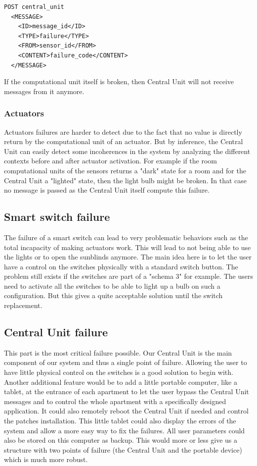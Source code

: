 \documentclass{acm_proc_article-sp}
\begin{document}
\begin{minipage}{\linewidth}
\begin{lstlisting}
POST central_unit 
  <MESSAGE>
    <ID>message_id</ID>
    <TYPE>failure</TYPE>
    <FROM>sensor_id</FROM>
    <CONTENT>failure_code</CONTENT>
  </MESSAGE>
\end{lstlisting}
\end{minipage}

If the computational unit itself is broken, then Central Unit will not receive messages from it anymore.
\subsubsection{Actuators} 
Actuators failures are harder to detect due to the fact that no value is directly return by the computational unit of an actuator.
But by inference, the Central Unit can easily detect some incoherences in the system by analyzing the different contexts before and after actuator activation.
For example if the room computational units of the sensors returns a "dark" state for a room and for the Central Unit a "lighted" state, then the light bulb might be broken.
In that case no message is passed as the Central Unit itself compute this failure.
\subsection{Smart switch failure}
The failure of a smart switch can lead to very problematic behaviors such as the total incapacity of making actuators work.
This will lead to not being able to use the lights or to open the sunblinds anymore.
The main idea here is to let the user have a control on the switches physically with a standard switch button.
The problem still exists if the switches are part of a "schema 3" for example. The users need to activate all the switches to be able to light up a bulb on such a configuration.
But this gives a quite acceptable solution until the switch replacement.
\\
\subsection{Central Unit failure}
This part is the most critical failure possible.
Our Central Unit is the main component of our system and thus a single point of failure.
Allowing the user to have little physical control on the switches is a good solution to begin with.
Another additional feature would be to add a little portable computer, like a tablet, at the entrance of each apartment 
to let the user bypass the Central Unit messages and to control the whole apartment with a specifically designed application.
It could also remotely reboot the Central Unit if needed and control the patches installation.
This little tablet could also display the errors of the system and allow a more easy way to fix the failures.
All user parameters could also be stored on this computer as backup.
This would more or less give us a structure with two points of failure (the Central Unit and the portable device) which is much more robust.
\end{document}
